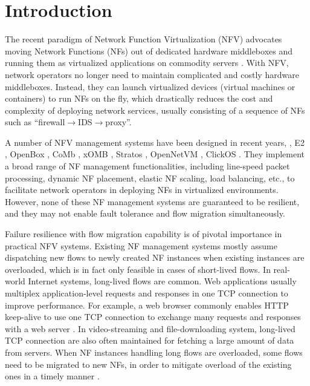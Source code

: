\section{Introduction}

The recent paradigm of Network Function Virtualization (NFV) advocates moving
Network Functions (NFs) out of dedicated hardware middleboxes and running them as
virtualized applications on commodity servers \cite{nfv-white-paper}. With NFV, network
operators no longer need to maintain complicated and costly hardware middleboxes. Instead,
they can launch virtualized devices (virtual machines or containers) to run NFs on the fly, which
drastically reduces the cost and complexity of deploying network services, usually consisting of a sequence of NFs such as ``firewall$\rightarrow$IDS$\rightarrow$proxy''.

A number of NFV management systems have been designed in recent years, \eg, E2 \cite{palkar2015e2}, OpenBox \cite{bremler2015openbox}, CoMb
\cite{sekar2012design}, xOMB \cite{anderson2012xomb}, Stratos
\cite{gember2012stratos}, OpenNetVM \cite{hwang2015netvm, zhang2016opennetvm}, ClickOS \cite{martins2014clickos}. They implement a
broad range of NF management functionalities, including line-speed packet processing, dynamic NF placement, elastic NF scaling,
load balancing, etc., to facilitate network operators in deploying NFs in virtualized environments. However, none of these NF management systems are guaranteed to
be resilient, and they may not enable fault
tolerance \cite{rajagopalan2013pico, sherry2015rollback} and flow
migration \cite{gember2015opennf, rajagopalan2013split, khalid2016paving} simultaneously. %

Failure resilience with flow migration capability is of pivotal importance in practical NFV systems. Existing NF management systems mostly assume dispatching new flows to newly created NF instances when existing instances are overloaded, which is in fact only feasible in cases of short-lived flows. In real-world Internet systems, long-lived flows are common. Web applications %
 usually multiplex application-level requests and responses in
one TCP connection to improve performance. For example, a web browser commonly enables HTTP
keep-alive to use one TCP connection to exchange many requests and responses with a
web server \cite{http-keep-alive}. In video-streaming
\cite{ffmpeg} and file-downloading \cite{ftp} system, long-lived TCP
connection are also often maintained for fetching a large amount of data from servers. %
 When NF instances handling long flows are overloaded, some flows need to be migrated to new NFs, in order to mitigate overload of the existing ones in a timely manner \cite{gember2015opennf}.

